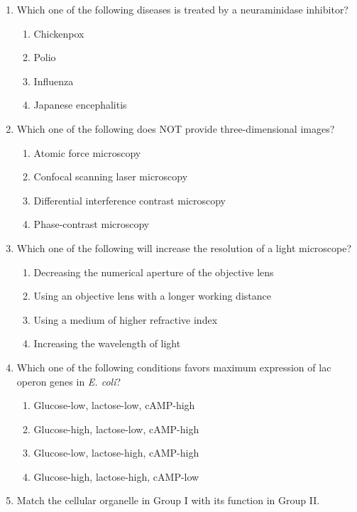 \documentclass[journal,12pt,onecolumn]{IEEEtran}
\begin{document}
\begin{enumerate}[label=\arabic*.]
\item Which one of the following diseases is treated by a neuraminidase inhibitor?
\begin{multicols}{2}
\begin{enumerate}[label=(\Alph*)]
\item Chickenpox
\item Polio
\item Influenza
\item Japanese encephalitis
\end{enumerate}
\end{multicols}

\item Which one of the following does NOT provide three-dimensional images?
\begin{enumerate}[label=(\Alph*)]
\item Atomic force microscopy
\item Confocal scanning laser microscopy
\item Differential interference contrast microscopy
\item Phase-contrast microscopy
\end{enumerate}

\item Which one of the following will increase the resolution of a light microscope?
\begin{enumerate}[label=(\Alph*)]
\item Decreasing the numerical aperture of the objective lens
\item Using an objective lens with a longer working distance
\item Using a medium of higher refractive index
\item Increasing the wavelength of light
\end{enumerate}

\item Which one of the following conditions favors maximum expression of lac operon genes in \textit{E. coli}?
\begin{enumerate}[label=(\Alph*)]
\item Glucose-low, lactose-low, cAMP-high
\item Glucose-high, lactose-low, cAMP-high
\item Glucose-low, lactose-high, cAMP-high
\item Glucose-high, lactose-high, cAMP-low
\end{enumerate}

\item Match the cellular organelle in Group I with its function in Group II.\\


\end{enumerate}
\end{document}
